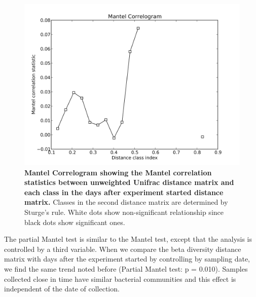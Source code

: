 \begin{figure}[htbp]
\includegraphics[width=0.75\columnwidth]{chapter_book_figures/Figure_10.jpg}
\caption[Mantel Correlogram showing the Mantel correlation statistics between unweighted Unifrac distance matrix and each class in the days after experiment started distance matrix]{\textbf{Mantel Correlogram showing the Mantel correlation statistics between unweighted Unifrac distance matrix and each class in the days after experiment started distance matrix.}
Classes in the second distance matrix are determined by Sturge's rule. White dots show non-significant relationship since black dots show significant ones.}
\label{bfigure10}
\end{figure}

The partial Mantel test is similar to the Mantel test, except that the analysis is
controlled by a third variable. When we compare the beta diversity distance matrix
with days after the experiment started by controlling by sampling date, we find the
same trend noted before (Partial Mantel test: p = 0.010). Samples collected
close in time have similar bacterial communities and this effect is independent of the date of collection.

